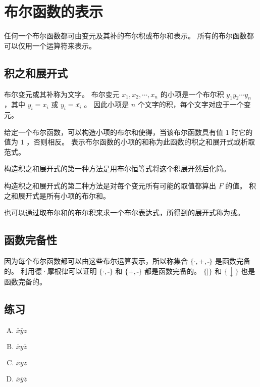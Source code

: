 
\section{布尔函数的表示}
{
    任何一个布尔函数都可由变元及其补的布尔积或布尔和表示。
    所有的布尔函数都可以仅用一个运算符来表示。

    \subsection{积之和展开式}
    {
        \begin{defines}
            布尔变元或其补称为文字。
            布尔变元 $x_1, x_2, \cdots, x_n$ 的小项是一个布尔积 $y_1y_2\cdots y_n$ ，其中 $y_i = x_i$ 或 $y_i = \bar{x_i}$ 。
            因此小项是 $n$ 个文字的积，每个文字对应于一个变元。
        \end{defines}

        给定一个布尔函数，可以构造小项的布尔和使得，当该布尔函数具有值 $1$ 时它的值为 $1$ ，否则相反。
        表示布尔函数的小项的和称为此函数的积之和展开式或析取范式。

        构造积之和展开式的第一种方法是用布尔恒等式将这个积展开然后化简。

        构造积之和展开式的第二种方法是对每个变元所有可能的取值都算出 $F$ 的值。
        积之和展开式是所有小项的布尔和。

        也可以通过取布尔和的布尔积来求一个布尔表达式，所得到的展开式称为或。
    }

    \subsection{函数完备性}
    {
        因为每个布尔函数都可以由这些布尔运算表示，所以称集合 $\{\cdot, +, \bar{}\}$ 是函数完备的。
        利用德·摩根律可以证明 $\{\cdot, \bar{}\}$ 和 $\{+, \bar{}\}$ 都是函数完备的。
        $\{|\}$ 和 $\{\downarrow\}$ 也是函数完备的。
    }

    \subsection{练习}
    {
        \begin{practices}
            \begin{enumerate}[A.]
                \item $\bar{x}\bar{y}z$
                \item $\bar{x}y\bar{z}$
                \item $\bar{x}yz$
                \item $\bar{x}\bar{y}\bar{z}$
            \end{enumerate}
        \end{practices}

}}
